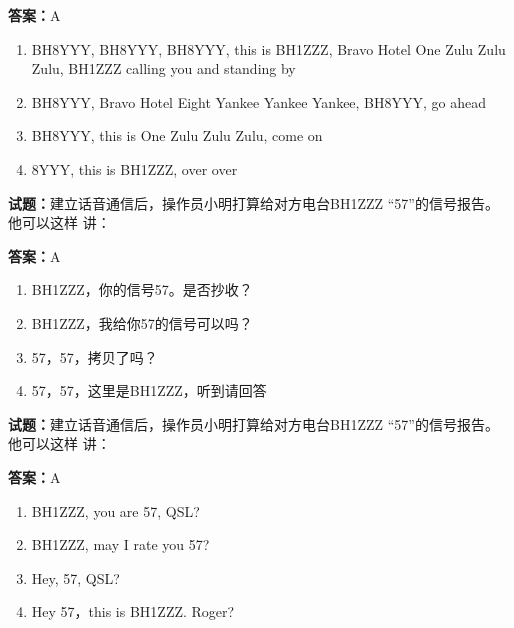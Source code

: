 \documentclass{ctexbook}
\begin{document}
\textbf{答案：}A 

\begin{enumerate}[leftmargin=3em]
  \item BH8YYY, BH8YYY, BH8YYY, this is BH1ZZZ, Bravo Hotel One Zulu Zulu Zulu, BH1ZZZ calling you 
and standing by 

  \item BH8YYY, Bravo Hotel Eight Yankee Yankee Yankee, BH8YYY, go ahead 

  \item BH8YYY, this is One Zulu Zulu Zulu, come on 

  \item 8YYY, this is BH1ZZZ, over over 

\end{enumerate}






\vspace{1em}

\textbf{试题：}建立话音通信后，操作员小明打算给对方电台BH1ZZZ “57”的信号报告。他可以这样
讲： 

\textbf{答案：}A 

\begin{enumerate}[leftmargin=3em]
  \item BH1ZZZ，你的信号57。是否抄收？ 

  \item BH1ZZZ，我给你57的信号可以吗？ 

  \item 57，57，拷贝了吗？ 

  \item 57，57，这里是BH1ZZZ，听到请回答 

\end{enumerate}





\vspace{1em}

\textbf{试题：}建立话音通信后，操作员小明打算给对方电台BH1ZZZ “57”的信号报告。他可以这样
讲： 

\textbf{答案：}A 

\begin{enumerate}[leftmargin=3em]
  \item BH1ZZZ, you are 57, QSL? 

  \item BH1ZZZ, may I rate you 57? 

  \item Hey, 57, QSL? 

  \item Hey 57，this is BH1ZZZ. Roger? 

\end{enumerate}
\end{document}
